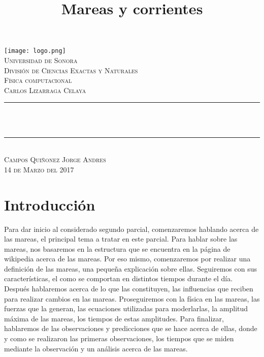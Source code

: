 \documentclass{article}
\title{Mareas y corrientes}
\makeatletter
\let\thetitle\@title
\makeatother
\begin{document}
\begin{titlepage}
\centering
  \vspace*{0.5 cm}
   \texttt{[image: logo.png]}\\[0.5 cm]%
    \textsc{\LARGE Universidad de Sonora}\\[1.0 cm]	%
	\textsc{\LARGE División de Ciencias Exactas y Naturales}\\[0.5 cm]	
    
	\textsc{\LARGE Física computacional}\\
    \textsc{\Large Carlos Lizarraga Celaya}\\ [0.5 cm]
    \rule{\linewidth}{0.2 mm} \\[0.4 cm]
	{ \huge \bfseries \thetitle}\\
	\rule{\linewidth}{0.2 mm} \\[0.5 cm]
    \textsc{\Large Campos Quiñonez Jorge Andres} \\[0.25 cm]
   \textsc {\large 14 de Marzo del 2017} 	

	
 
	\vfill
	
\end{titlepage}
\pagebreak

\newpage

\pagebreak
\tableofcontents
\pagebreak
\onehalfspacing

\section*{\LARGE Introducción}
\large Para dar inicio al considerado segundo parcial, comenzaremos hablando acerca de las mareas, el principal tema a tratar en este parcial. Para hablar sobre las mareas, nos basaremos en la estructura que se encuentra en la página de wikipedia acerca de las mareas. Por eso mismo, comenzaremos por realizar una definición de las mareas, una pequeña explicación sobre ellas. Seguiremos con sus características, el como se comportan en distintos tiempos durante el día. Después hablaremos acerca de lo que las constituyen, las influencias que reciben para realizar cambios en las mareas. Proseguiremos con la física en las mareas, las fuerzas que la generan, las ecuaciones utilizadas para moderlarlas, la amplitud máxima de las mareas, los tiempos de estas amplitudes. Para finalizar, hablaremos de las observaciones y predicciones que se hace acerca de ellas, donde y como se realizaron las primeras observaciones, los tiempos que se miden mediante la observación y un análisis acerca de las mareas.
\pagebreak
\end{document}
